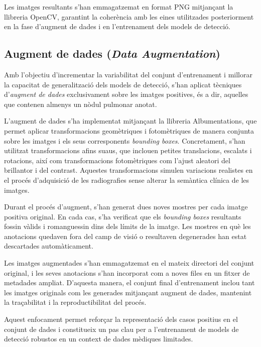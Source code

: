 \documentclass[12pt,a4paper]{article}
\begin{document}
Les imatges resultants s’han emmagatzemat en format PNG mitjançant la llibreria OpenCV, garantint la coherència amb les eines utilitzades posteriorment en la fase d’augment de dades i en l’entrenament dels models de detecció.

\subsection{Augment de dades (\textit{Data Augmentation})}

Amb l’objectiu d’incrementar la variabilitat del conjunt d’entrenament i millorar la capacitat de generalització dels models de detecció, s’han aplicat tècniques d’\textit{augment de dades} exclusivament sobre les imatges positives, és a dir, aquelles que contenen almenys un nòdul pulmonar anotat.

L’augment de dades s’ha implementat mitjançant la llibreria Albumentations, que permet aplicar transformacions geomètriques i fotomètriques de manera conjunta sobre les imatges i els seus corresponents \textit{bounding boxes}. Concretament, s’han utilitzat transformacions afins suaus, que inclouen petites translacions, escalats i rotacions, així com transformacions fotomètriques com l’ajust aleatori del brillantor i del contrast. Aquestes transformacions simulen variacions realistes en el procés d’adquisició de les radiografies sense alterar la semàntica clínica de les imatges.

Durant el procés d’augment, s’han generat dues noves mostres per cada imatge positiva original. En cada cas, s’ha verificat que els \textit{bounding boxes} resultants fossin vàlids i romanguessin dins dels límits de la imatge. Les mostres en què les anotacions quedaven fora del camp de visió o resultaven degenerades han estat descartades automàticament.

Les imatges augmentades s’han emmagatzemat en el mateix directori del conjunt original, i les seves anotacions s’han incorporat com a noves files en un fitxer de metadades ampliat. D’aquesta manera, el conjunt final d’entrenament inclou tant les imatges originals com les generades mitjançant augment de dades, mantenint la traçabilitat i la reproductibilitat del procés.

Aquest enfocament permet reforçar la representació dels casos positius en el conjunt de dades i constitueix un pas clau per a l’entrenament de models de detecció robustos en un context de dades mèdiques limitades.
\end{document}
